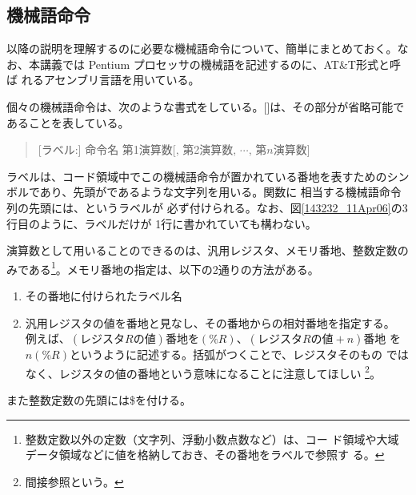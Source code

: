 \subsection{機械語命令}

以降の説明を理解するのに必要な機械語命令について、簡単にまとめておく。な
お、本講義では Pentium プロセッサの機械語を記述するのに、AT\&T形式と呼ば
れるアセンブリ言語を用いている。

個々の機械語命令は、次のような書式をしている。[]は、その部分が省略可能で
あることを表している。
\begin{quote}
 [ラベル:] 命令名 第1演算数[, 第2演算数, $\cdots$, 第$n$演算数]
\end{quote}

ラベルは、コード領域中でこの機械語命令が置かれている番地を表すためのシン
ボルであり、先頭が\icode{\underline{ }}であるような文字列を用いる。関数に
相当する機械語命令列の先頭には、というラベルが
必ず付けられる。なお、図\ref{143232_11Apr06}の3行目のように、ラベルだけが
1行に書かれていても構わない。

演算数として用いることのできるのは、汎用レジスタ、メモリ番地、整数定数の
みである\footnote{整数定数以外の定数（文字列、浮動小数点数など）は、コー
ド領域や大域データ領域などに値を格納しておき、その番地をラベルで参照す
る。}。メモリ番地の指定は、以下の2通りの方法がある。
\begin{enumerate}
 \item その番地に付けられたラベル名
 \item 汎用レジスタの値を番地と見なし、その番地からの相対番地を指定する。
       例えば、$(レジスタRの値)$番地を$(\%R)$、$(レジスタRの値 + n)$番地
       を$n(\%R)$というように記述する。括弧がつくことで、レジスタそのもの
       ではなく、レジスタの値の番地という意味になることに注意してほしい
       \footnote{間接参照という。}。
\end{enumerate}
また整数定数の先頭には\$を付ける。

